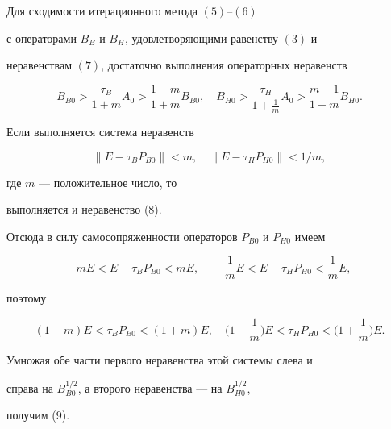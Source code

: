  


\begin{thm} 


Для сходимости итерационного метода $(5)$--$(6)$ 


с операторами $B_B$ и $B_H$, удовлетворяющими равенству $(3)$ и  


неравенствам $(7)$, достаточно выполнения операторных неравенств 


\begin{equation} 


B_{B0}>\frac{\tau_B}{1+m}A_0>\frac{1-m}{1+m}B_{B0},\quad 


B_{H0}>\frac{\tau_H}{1+\frac{1}{m}}A_0>\frac{m-1}{1+m}B_{H0}. 


\end{equation} 


\end{thm} 


 


\begin{pf} 


Если выполняется система неравенств 


$$ 


\|E-\tau_B P_{B0}\|<m,\quad \|E-\tau_H P_{H0}\|<1/m, 


$$ 


где $m$ --- положительное число, то 


выполняется и неравенство (8). 


Отсюда в силу самосопряженности операторов $P_{B0}$ и $P_{H0}$ имеем 


$$ 


-m E<E-\tau_B P_{B0}<m E,\quad 


-\frac{1}{m}E<E-\tau_H P_{H0}<\frac{1}{m}E, 


$$ 


поэтому 


$$ 


(1-m)E<\tau_B P_{B0}<(1+m)E,\quad 


\bigg(1-\frac{1}{m}\bigg)E<\tau_H P_{H0}< 


\bigg(1+\frac{1}{m} \bigg)E. 


$$ 


Умножая обе части первого неравенства этой системы слева и  


справа на $B^{1/2}_{B0}$, а второго неравенства --- на $B^{1/2}_{H0}$, 


получим (9). 


\end{pf} 


